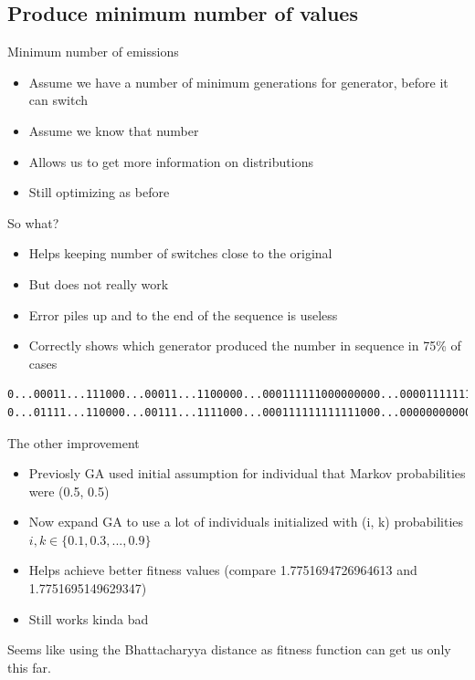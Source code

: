 \documentclass[hyperref=unicode,graphics=pdflatex,13pt]{beamer}
\begin{document}
\subsection{Produce minimum number of values}
\begin{frame}{Minimum number of emissions}
 \begin{itemize}
  \item Assume we have a number of minimum generations for generator, before it can switch
  \item Assume we know that number
  \item Allows us to get more information on distributions
  \item Still optimizing as before
 \end{itemize}
\end{frame}

\begin{frame}[fragile]{So what?}
 \begin{itemize}
  \item Helps keeping number of switches close to the original
  \item But does not really work
  \item Error piles up and to the end of the sequence is useless
  \item Correctly shows which generator produced the number in sequence in 75\% of cases
 \end{itemize}

 \tiny\begin{lstlisting}
0...00011...111000...00011...1100000...000111111000000000...0000111111111
0...01111...110000...00111...1111000...000111111111111000...0000000000001
 \end{lstlisting}
\end{frame}

\begin{frame}{The other improvement}
 \begin{itemize}
  \item Previosly GA used initial assumption for individual that Markov probabilities were (0.5, 0.5)
  \item Now expand GA to use a lot of individuals initialized with (i, k) probabilities $i,k \in \{0.1,0.3,...,0.9\}$
  \item Helps achieve better fitness values (compare 1.7751694726964613 and 1.7751695149629347)
  \item Still works kinda bad
 \end{itemize}
  
 Seems like using the Bhattacharyya distance as fitness function can get us only this far.
\end{frame}
\end{document}

